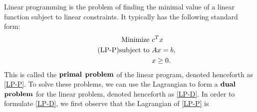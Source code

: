 	Linear programming is the problem of finding the minimal value of a linear function subject to linear constraints. It typically has the following standard form:
	\begin{equation} \label{LP-P} \tag{LP-P}
		\begin{split}
			\textnormal{Minimize } & c^T x \\
			\textnormal{subject to } & Ax = b, \\
			& x \geq 0.
		\end{split}
	\end{equation}
	This is called the $\bf{primal}$ $\bf{problem}$ of the linear program, denoted henceforth as \eqref{LP-P}. To solve these problems, we can use the Lagrangian to form a $\bf{dual}$ $\bf{problem}$ for the linear problem, denoted henceforth as \eqref{LP-D}. In order to formulate \eqref{LP-D}, we first observe that the Lagrangian of \eqref{LP-P} is

